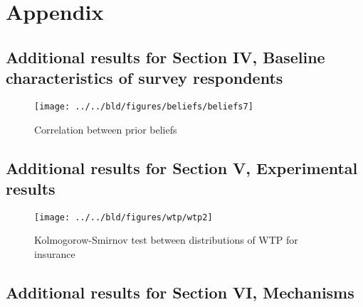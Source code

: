 \section*{Appendix}

\subsection{Additional results for Section IV, Baseline characteristics of survey respondents}




\newpage

\begin{figure}[H]
    \centering
    \caption{Correlation between prior beliefs}
    \label{fig:beliefs-corr}
    \texttt{[image: ../../bld/figures/beliefs/beliefs7]}%
\end{figure}

\newpage

\subsection{Additional results for Section V, Experimental results}\label{appendix-experimental-results}







\begin{figure}[H]
    \centering
    \caption{Kolmogorow-Smirnov test between distributions of WTP for insurance}
    \label{fig:kolmogorov}
    \texttt{[image: ../../bld/figures/wtp/wtp2]}%
\end{figure}

\newpage

\subsection{Additional results for Section VI, Mechanisms}\label{appendix-mechanisms}



